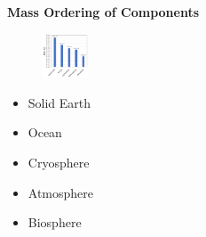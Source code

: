 \documentclass[fontsize=8pt, a4paper, landscape, fleqn]{scrartcl}
\renewcommand{\subsection}[1]{%
    \noindent\colorbox{subsectioncolor}{%
        \parbox{\dimexpr\columnwidth-2\fboxsep}{\color{white}\textbf{#1}}}%
    \vspace{0.5mm}%
}
\begin{document}
\begin{multicols*}{3}[\raggedcolumns]
\subsection{Mass Ordering of Components}
\begin{figure}
    \centering
    \includegraphics[width=0.12\textwidth]{Secondary/img/Pasted image 20250407160249.png}
\end{figure}
\begin{itemize}
    \item Solid Earth
    \item Ocean
    \item Cryosphere
    \item Atmosphere
    \item Biosphere
\end{itemize}


\end{multicols*}
\end{document}
